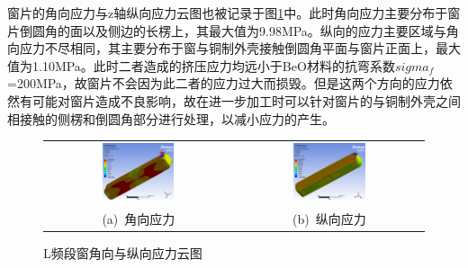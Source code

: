 \documentclass[master]{thesis-uestc}
\begin{document}
窗片的角向应力与z轴纵向应力云图也被记录于图\ref{fig:L频段窗角向纵向应力分布}中。此时角向应力主要分布于窗片倒圆角的面以及侧边的长楞上，其最大值为9.98MPa。纵向的应力主要区域与角向应力不尽相同，其主要分布于窗与铜制外壳接触倒圆角平面与窗片正面上，最大值为1.10MPa。此时二者造成的挤压应力均远小于BeO材料的抗弯系数\(sigma_f\)=200MPa，故窗片不会因为此二者的应力过大而损毁。但是这两个方向的应力依然有可能对窗片造成不良影响，故在进一步加工时可以针对窗片的与铜制外壳之间相接触的侧楞和倒圆角部分进行处理，以减小应力的产生。
\begin{figure}[!htb]
    \small
    \centering
    \begin{tabular}{@{\ }c@{\ }c}
        \includegraphics[width=0.4\textwidth]{pic/chapter4/L角向应力.png} & 
        \hspace{5pt}
        \includegraphics[width=0.4\textwidth]{pic/chapter4/L纵向应力.png}     \\
        \mbox{\small (a) 角向应力}                                                                               & 
        \mbox{\small (b) 纵向应力}                                                                                  \\
    \end{tabular}
    \caption{L频段窗角向与纵向应力云图}
    \label{fig:L频段窗角向纵向应力分布}
\end{figure}
\end{document}
